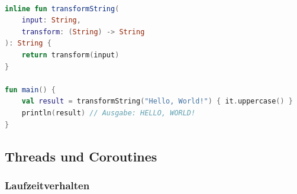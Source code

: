 \documentclass[11pt]{article}
\begin{document}
    \begin{lstlisting}[language=Kotlin, caption={InlineFunction.kt}, label={lst:kotlin-inline-function}]

inline fun transformString(
    input: String,
    transform: (String) -> String
): String {
    return transform(input)
}

fun main() {
    val result = transformString("Hello, World!") { it.uppercase() }
    println(result) // Ausgabe: HELLO, WORLD!
}
    \end{lstlisting}

    \subsection{Threads und Coroutines}

    \subsubsection{Laufzeitverhalten}
\end{document}
